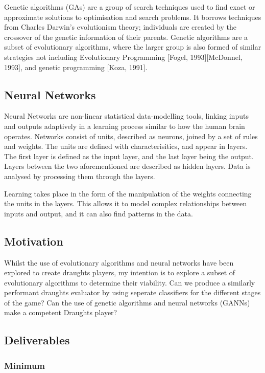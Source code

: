 \documentclass[12pt,a4paper]{article}
\begin{document}
Genetic algorithms (GAs) are a group of search techniques used to find exact or approximate solutions to optimisation and search problems. It borrows techniques from Charles Darwin's evolutionism theory; individuals are created by the crossover of the genetic information of their parents. 
Genetic algorithms are a subset of evolutionary algorithms, where the larger group is also formed of similar strategies not including Evolutionary Programming [Fogel, 1993][McDonnel, 1993], and genetic programming [Koza, 1991].

\subsection*{Neural Networks}

Neural Networks are non-linear statistical data-modelling tools, linking inputs and outputs adaptively in a learning process similar to how the human brain operates. Networks consist of units, described as neurons, joined by a set of rules and weights. The units are defined with characterisitics, and appear in layers. The first layer is defined as the input layer, and the last layer being the output. Layers between the two aforementioned are described as hidden layers. Data is analysed by processing them through the layers.

Learning takes place in the form of the manipulation of the weights connecting the units in the layers. This allows it to model complex relationships between inputs and output, and it can also find patterns in the data. 

\subsection*{Motivation}
Whilst the use of evolutionary algorithms and neural networks have been explored to create draughts players, my intention is to explore a subset of evolutionary algorithms to determine their viability. Can we produce a similarly performant draughts evaluator by using seperate classifiers for the different stages of the game? Can the use of genetic algorithms and neural networks (GANNs) make a competent Draughts player?

\subsection*{Deliverables}

\subsubsection*{Minimum}
\end{document}
